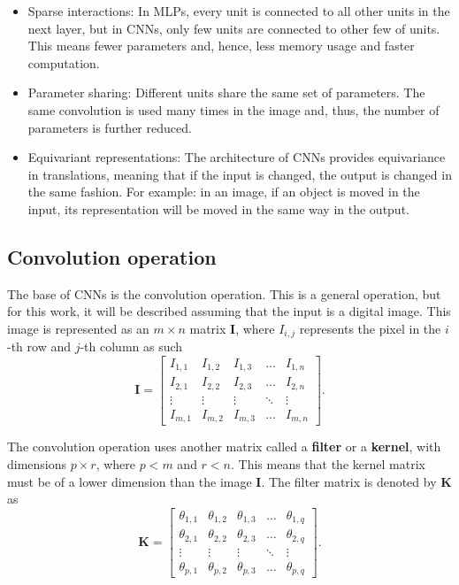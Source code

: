 \begin{itemize}
  \item Sparse interactions: In MLPs, every unit is connected to all other units in the next layer, but in CNNs, only few units are connected to other few of units. This means fewer parameters and, hence, less memory usage and faster computation.
  \item Parameter sharing: Different units share the same set of parameters. The same convolution is used many times in the image and, thus, the number of parameters is further reduced.
  \item Equivariant representations: The architecture of CNNs provides equivariance in translations, meaning that if the input is changed, the output is changed in the same fashion. For example: in an image, if an object is moved in the input, its representation will be moved in the same way in the output.
\end{itemize}

\subsection{Convolution operation}

The base of CNNs is the convolution operation. This is a general operation, but for this work, it will be described assuming that the input is a digital image. This image is represented as an $m \times n$ matrix $\boldsymbol{I}$, where $I_{i,j}$ represents the pixel in the $i$-th row and $j$-th column as such
\begin{equation}
  \boldsymbol{I} =
    \begin{bmatrix}
      I_{1,1} & I_{1,2} & I_{1,3} & \dots  & I_{1,n} \\
      I_{2,1} & I_{2,2} & I_{2,3} & \dots  & I_{2,n} \\
      \vdots & \vdots & \vdots & \ddots & \vdots \\
      I_{m,1} & I_{m,2} & I_{m,3} & \dots  & I_{m,n}
    \end{bmatrix}.
\end{equation}

The convolution operation uses another matrix called a \textbf{filter} or a \textbf{kernel}, with dimensions $p \times r$, where $p < m$ and $r < n$. This means that the kernel matrix must be of a lower dimension than the image $\boldsymbol{I}$. The filter matrix is denoted by $\boldsymbol{K}$ as
\begin{equation}
  \boldsymbol{K} =
    \begin{bmatrix}
      \theta_{1,1} & \theta_{1,2} & \theta_{1,3} & \dots  & \theta_{1,q} \\
      \theta_{2,1} & \theta_{2,2} & \theta_{2,3} & \dots  & \theta_{2,q} \\
      \vdots & \vdots & \vdots & \ddots & \vdots \\
      \theta_{p,1} & \theta_{p,2} & \theta_{p,3} & \dots  & \theta_{p,q}
    \end{bmatrix}.
\end{equation}

